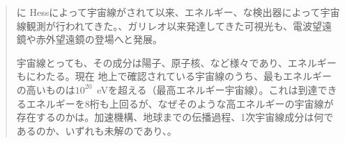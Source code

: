\begin{quotation}
\DIFdelbegin {}\DIFdelend \DIFaddbegin {}\DIFaddend \DIFdelbegin {}\DIFdelend \DIFaddbegin {}\DIFaddend に Hess\DIFdelbegin {}\DIFdelend によって宇宙線\DIFdelbegin {}\DIFdelend が\DIFdelbegin {}\DIFdelend \DIFaddbegin {}\DIFaddend されて以来、\DIFdelbegin {}\DIFdelend \DIFaddbegin {}\DIFaddend エネルギー\DIFdelbegin {}\DIFdelend \DIFaddbegin {}\DIFaddend 、\DIFdelbegin {}\DIFdelend \DIFaddbegin {}\DIFaddend な検出器によって宇宙線\DIFdelbegin {}\DIFdelend 観測が行われてきた。\DIFdelbegin {}\DIFdelend \DIFaddbegin {}\DIFaddend 、ガリレオ以来発達してきた可視光\DIFdelbegin {}\DIFdelend \DIFaddbegin {}\DIFaddend も、電波望遠鏡や赤外望遠鏡\DIFaddbegin {}\DIFaddend の登場\DIFdelbegin {}\DIFdelend \DIFaddbegin {}\DIFaddend へと発展\DIFdelbegin {}\DIFdelend \DIFaddbegin {}\DIFaddend 。

宇宙線と\DIFdelbegin {}\DIFdelend \DIFaddbegin {}\DIFaddend っても、その成分は\DIFdelbegin {}\DIFdelend 陽子、原子核、\DIFdelbegin {}\DIFdelend \DIFaddbegin {}\DIFaddend など様々であり、\DIFdelbegin {}\DIFdelend \DIFaddbegin {}\DIFaddend エネルギー\DIFaddbegin {}\DIFaddend も\DIFdelbegin {}\DIFdelend \DIFaddbegin {}\DIFaddend に\DIFaddbegin {}\DIFaddend わたる。現在 \DIFaddbegin {}\DIFaddend 地\DIFdelbegin {}\DIFdelend 上で確認されている宇宙線のうち、最もエネルギーの高いものは$10^{20}$~eVを超える（\DIFaddbegin {}\DIFaddend 最高エネルギー宇宙線）。これは\DIFdelbegin {}\DIFdelend \DIFaddbegin {}\DIFaddend 到達できるエネルギーを\DIFdelbegin {}\DIFdelend 8桁も上回るが、なぜそのような高\DIFaddbegin {}\DIFaddend エネルギーの宇宙線が存在するのかは\DIFdelbegin {}\DIFdelend \DIFaddbegin {}\DIFaddend 。\DIFaddbegin {}\DIFaddend 加速機構、地球までの伝播過程、\DIFaddbegin {}\DIFaddend 1次宇宙線成分は何であるのか\DIFaddbegin {}\DIFaddend 、いずれも未解\DIFdelbegin {}\DIFdelend \DIFaddbegin {}\DIFaddend の\DIFdelbegin {}\DIFdelend \DIFaddbegin {}\DIFaddend であり、\DIFdelbegin {}\DIFdelend \DIFaddbegin {}\DIFaddend 。
\end{quotation}

